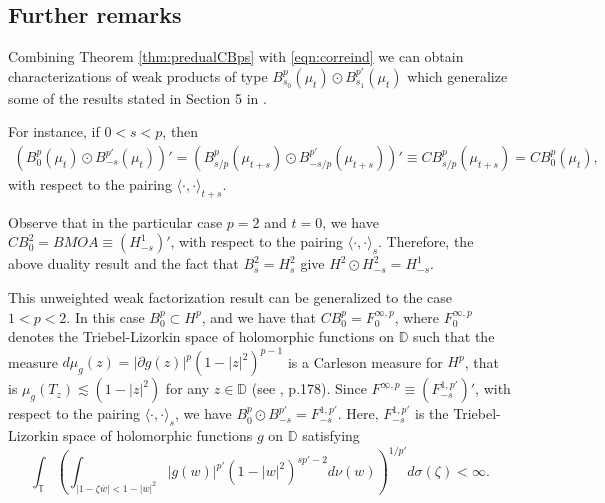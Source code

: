 \documentclass[12pt,twoside,leqno,final]{amsart}
\theoremstyle{plain}
\begin{document}
\subsection{Further remarks} 

Combining Theorem \ref{thm:predualCBps} with \eqref{eqn:correind} we can obtain 
characterizations of weak products of type $B^{p}_{s_0}(\mu_t)\odot B^{p'}_{s_1}(\mu_t)$ which generalize some of the results stated in Section 5 in \cite{Co-Ve}.

For instance, if $0<s<p$, then
\begin{align*}
\left(B^{p}_{0}(\mu_t)\odot B^{p'}_{-s}(\mu_t)\right)'
=\left(B^{p}_{s/p}(\mu_{t+s})\odot B^{p'}_{-s/p}(\mu_{t+s})\right)'\equiv CB^p_{s/p}(\mu_{t+s})=CB^p_0(\mu_t),
\end{align*} 
with respect to the pairing $\langle\cdot,\cdot\rangle_{t+s}$.

Observe that in the particular case $p=2$ and $t=0$, we have $CB^2_0=BMOA\equiv (H^1_{-s})'$, 
with respect to the pairing $\langle\cdot,\cdot\rangle_{s}$. 
Therefore, the above duality result and the fact that $B^2_s=H^2_s$ give 
$H^2\odot H^{2}_{-s}=H^1_{-s}$.

This unweighted weak factorization result can be generalized to the case $1<p<2$. In this case $B^p_0\subset H^p$, 
and we have that $CB^p_0=F^{\infty,p}_0$, where  $F^{\infty,p}_0$ denotes 
the Triebel-Lizorkin space 
of holomorphic functions on ${{\mathbb D}}$ such that the measure $d\mu_g(z)=|{\partial} g(z)|^p(1-|z|^2)^{p-1}$ 
is a Carleson measure for $H^p$, that is $\mu_g(T_z)\lesssim (1-|z|^2)$ for any $z\in {{\mathbb D}}$ 
(see \cite{Ma-Sha}, p.178).
Since $F^{\infty,p}\equiv (F^{1,p'}_{-s})'$, 
with respect to the pairing $\langle\cdot,\cdot\rangle_{s}$, we have 
$
B^{p}_{0}\odot B^{p'}_{-s}=F^{1,p'}_{-s}.
$
Here, $F^{1,p'}_{-s}$ is the Triebel-Lizorkin space of holomorphic functions $g$ on ${{\mathbb D}}$ satisfying 
$$
\int_{{\mathbb T}} \left(\int_{|1-{\zeta} \overline w|<1-|w|^2}| g(w)|^{p'}(1-|w|^2)^{sp'-2}d\nu(w)\right)^{1/p'}d\sigma({\zeta})<\infty.
$$
\end{document}
